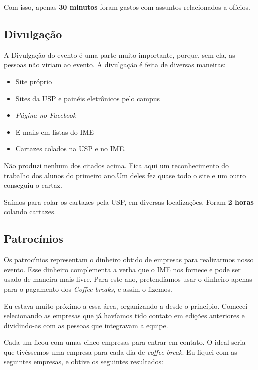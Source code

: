 \documentclass[12pt,letterpaper]{article}
\begin{document}
	Com isso, apenas \textbf{30 minutos} foram gastos com assuntos relacionados a ofícios.
	
	\subsection{Divulgação}
	
	A Divulgação do evento é uma parte muito importante, porque, sem ela, as pessoas não viriam ao evento. A divulgação é feita de diversas maneiras:
	
	\begin{itemize}
		\item Site próprio
		\item Sites da USP e painéis eletrônicos pelo campus
		\item \textit{Página no Facebook}
		\item E-mails em listas do IME
		\item Cartazes colados na USP e no IME.
	\end{itemize}

	Não produzi nenhum dos citados acima. Fica aqui um reconhecimento do trabalho dos alunos do primeiro ano.Um deles fez quase todo o site e um outro conseguiu o cartaz. 
	
	Saímos para colar os cartazes pela USP, em diversas localizações\cite{cartazes}. Foram \textbf{2 horas} colando cartazes. 
	
	\subsection{Patrocínios}
	
	Os patrocínios representam o dinheiro obtido de empresas para realizarmos nosso evento. Esse dinheiro complementa a verba que o IME nos fornece e pode ser usado de maneira mais livre. Para este ano, pretendíamos usar o dinheiro apenas para o pagamento dos \textit{Coffee-breaks}, e assim o fizemos. 
	
	Eu estava muito próximo a essa área, organizando-a desde o princípio. Comecei selecionando as empresas que já havíamos tido contato em edições anteriores e dividindo-as com as pessoas que integravam a equipe. 
	
	Cada um ficou com umas cinco empresas para entrar em contato. O ideal seria que tivéssemos uma empresa para cada dia de \textit{coffee-break}. Eu fiquei com as seguintes empresas, e obtive os seguintes resultados:
	
\end{document}
